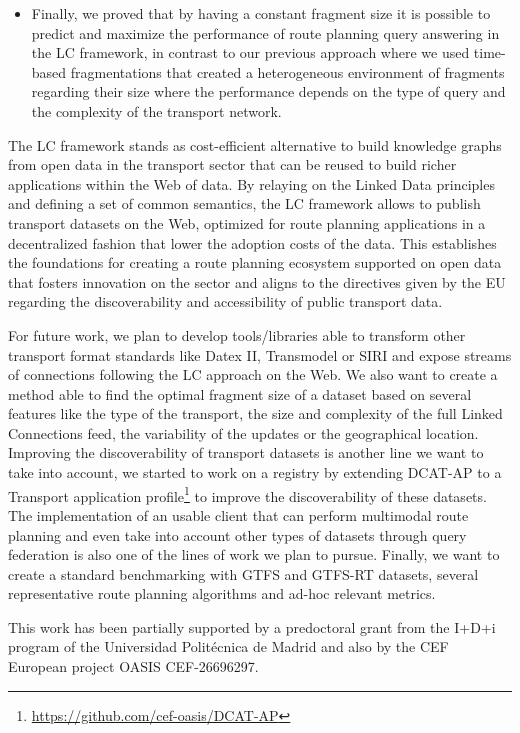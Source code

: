 \documentclass[sw]{iosart2x}
\begin{document}
\begin{itemize}
	\item Finally, we proved that by having a constant fragment size it is possible to predict and maximize the performance of route planning query answering in the LC framework, in contrast to our previous approach where we used time-based fragmentations that created a heterogeneous environment of fragments regarding their size where the performance depends on the type of query and the complexity of the transport network.  
	\end{itemize}
	
	The LC framework stands as cost-efficient alternative to build knowledge graphs from open data in the transport sector that can be reused to build richer applications within the Web of data. By relaying on the Linked Data principles and defining a set of common semantics, the LC framework allows to publish transport datasets on the Web, optimized for route planning applications in a decentralized fashion that lower the adoption costs of the data. This establishes the foundations for creating a route planning ecosystem supported on open data that fosters innovation on the sector and aligns to the directives given by the EU regarding the discoverability and accessibility of public transport data.   
	
	For future work, we plan to develop tools/libraries able to transform other transport format standards like Datex II, Transmodel or SIRI and expose streams of connections following the LC approach on the Web. We also want to create a method able to find the optimal fragment size of a dataset based on several features like the type of the transport, the size and complexity of the full Linked Connections feed, the variability of the updates or the geographical location. Improving the discoverability of transport datasets is another line we want to take into account, we started to work on a registry by extending DCAT-AP to a Transport application profile\footnote{\url{https://github.com/cef-oasis/DCAT-AP}} to improve the discoverability of these datasets. The implementation of an usable client that can perform multimodal route planning and even take into account other types of datasets through query federation is also one of the lines of work we plan to pursue. Finally, we want to create a standard benchmarking with GTFS and GTFS-RT datasets, several representative route planning algorithms and ad-hoc relevant metrics. 
	
	\begin{acks}
	This work has been partially supported by a predoctoral grant from the I+D+i program of the Universidad Polit\'ecnica de Madrid and also by the CEF European project OASIS CEF-26696297.
	\end{acks}
	
\end{document}
